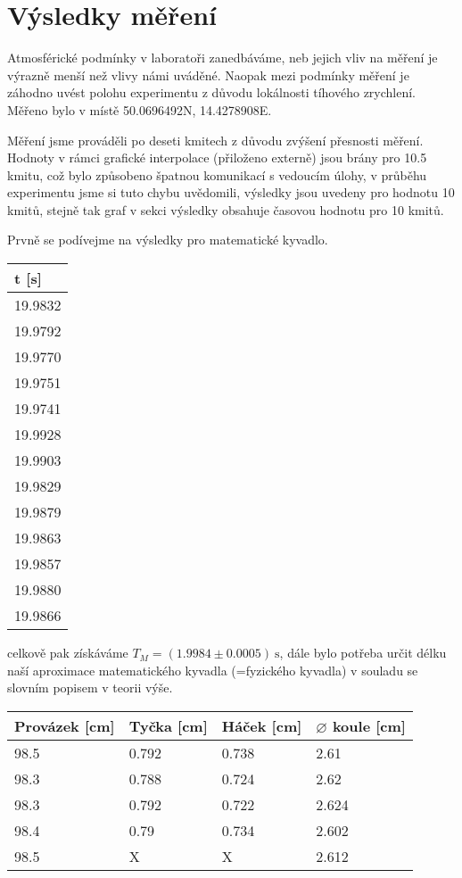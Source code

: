 \documentclass{article}
\begin{document}
\section*{Výsledky měření}
\par Atmosférické podmínky v laboratoři zanedbáváme, neb jejich vliv na měření je výrazně menší než vlivy námi uváděné. Naopak mezi podmínky měření je záhodno uvést polohu experimentu z důvodu lokálnosti tíhového zrychlení. Měřeno bylo v místě 50.0696492N, 14.4278908E.
\par Měření jsme prováděli po deseti kmitech z důvodu zvýšení přesnosti měření. Hodnoty v rámci grafické interpolace (přiloženo externě) jsou brány pro 10.5 kmitu, což bylo způsobeno špatnou komunikací s vedoucím úlohy, v průběhu experimentu jsme si tuto chybu uvědomili, výsledky jsou uvedeny pro hodnotu 10 kmitů, stejně tak graf v sekci výsledky obsahuje časovou hodnotu pro 10 kmitů.
\par Prvně se podívejme na výsledky pro matematické kyvadlo.
\bigbreak
\bigbreak
\begin{center}
    \label{tab:title}
    \begin{tabular}{ | m{2cm} |} \hline
    t [s]   \\ \hline
    19.9832 \\ \hline
    19.9792 \\ \hline
    19.9770  \\ \hline
    19.9751 \\ \hline
    19.9741 \\ \hline
    19.9928 \\ \hline
    19.9903 \\ \hline
    19.9829 \\ \hline
    19.9879 \\ \hline
    19.9863 \\ \hline
    19.9857 \\ \hline
    19.9880 \\ \hline
    19.9866 \\ \hline
    \end{tabular}
\end{center}
celkově pak získáváme $T_{M} = (1.9984\pm0.0005)\: \mathrm{s}$, dále bylo potřeba určit délku naší aproximace matematického kyvadla (=fyzického kyvadla) v souladu se slovním popisem v teorii výše.
\begin{center}
    \label{tab:title}
    \begin{tabular}{ | l | l | l | p{4cm} |} \hline
    Provázek [cm] & Tyčka [cm] & Háček [cm] & $\diameter$ koule [cm] \\ \hline
    98.5     & 0.792 & 0.738 & 2.61  \\ \hline
    98.3     & 0.788 & 0.724 & 2.62  \\ \hline
    98.3     & 0.792 & 0.722 & 2.624 \\ \hline
    98.4     & 0.79  & 0.734 & 2.602 \\ \hline
    98.5     &   X    &   X  & 2.612 \\ \hline
    \end{tabular}
\end{center}
\end{document}
